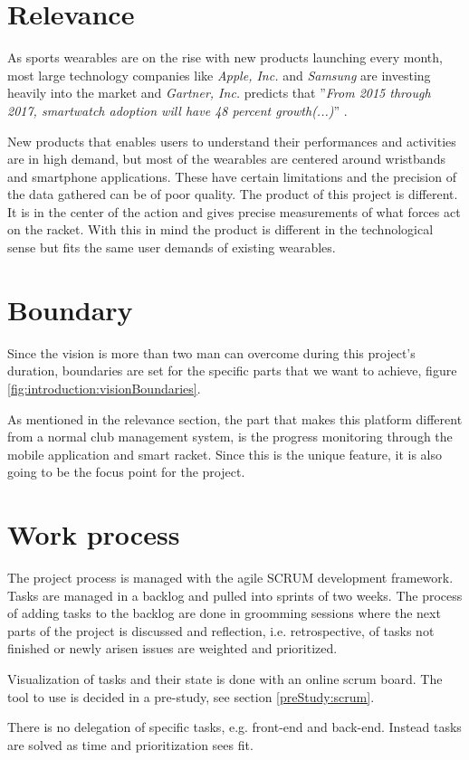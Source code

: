 \section*{Relevance}
As sports wearables are on the rise with new products launching every month, most large technology companies like \textit{Apple, Inc.} and \textit{Samsung} are investing heavily into the market and \textit{Gartner, Inc.} predicts that ''\textit{From 2015 through 2017, smartwatch adoption will have 48 percent growth(...)}'' \citep{introduction:relevance:gartner}.

New products that enables users to understand their performances and activities are in high demand, but most of the wearables are centered around wristbands and smartphone applications.
These have certain limitations and the precision of the data gathered can be of poor quality.
The product of this project is different.
It is in the center of the action and gives precise measurements of what forces act on the racket.
With this in mind the product is different in the technological sense but fits the same user demands of existing wearables.

\section*{Boundary}
Since the vision is more than two man can overcome during this project's duration, boundaries are set for the specific parts that we want to achieve, figure \ref{fig:introduction:visionBoundaries}.

As mentioned in the relevance section, the part that makes this platform different from a normal club management system, is the progress monitoring through the mobile application and smart racket.
Since this is the unique feature, it is also going to be the focus point for the project.


\section*{Work process}
The project process is managed with the agile SCRUM development framework.
Tasks are managed in a backlog and pulled into sprints of two weeks.
The process of adding tasks to the backlog are done in groomming sessions where the next parts of the project is discussed and reflection, i.e. retrospective, of tasks not finished or newly arisen issues are weighted and prioritized.

Visualization of tasks and their state is done with an online scrum board.
The tool to use is decided in a pre-study, see section \ref{preStudy:scrum}.

There is no delegation of specific tasks, e.g. front-end and back-end.
Instead tasks are solved as time and prioritization sees fit.
